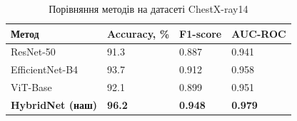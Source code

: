 \begin{table}[H]
  \caption{Порівняння методів на датасеті ChestX-ray14}
  \label{tbl:results}
  \centering
  \begin{tabularx}{\linewidth}{|Z{1.6}|Z{0.8}|Z{0.8}|Z{0.8}|}
    \hline
    \textbf{Метод} & \textbf{Accuracy, \%} & \textbf{F1-score} & \textbf{AUC-ROC} \\ \hline
    ResNet-50                   & 91.3          & 0.887          & 0.941          \\ \hline
    EfficientNet-B4             & 93.7          & 0.912          & 0.958          \\ \hline
    ViT-Base                    & 92.1          & 0.899          & 0.951          \\ \hline
    \textbf{HybridNet (наш)}    & \textbf{96.2} & \textbf{0.948} & \textbf{0.979} \\ \hline
  \end{tabularx}
\end{table}
